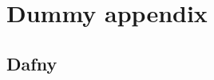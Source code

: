 \documentclass[12pt,openany,a4paper]{book}
\begin{document}

\newpage
{}
\mbox{}
\newpage



\chapter{Dummy appendix}

\section{Dafny}


\label {dafnybug1}
\end{document}
